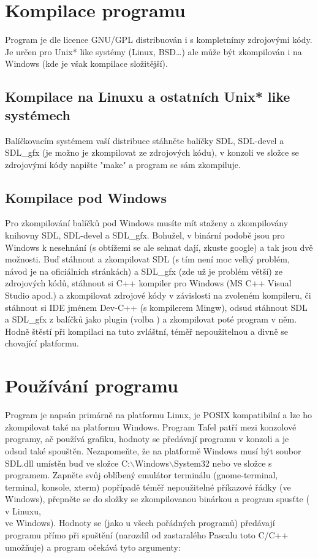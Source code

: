 \documentclass[a4paper,11pt,titlepage]{article}
\begin{document}
\section{Kompilace programu}
Program je dle licence GNU/GPL distribuován i s kompletnímy zdrojovými kódy. Je určen pro Unix* like systémy (Linux, BSD\ldots) ale může být zkompilován i na Windows (kde je však kompilace složitější).\\

\subsection{Kompilace na Linuxu a ostatních Unix* like systémech}
Balíčkovacím systémem vaší distribuce stáhněte balíčky SDL, SDL-devel a SDL\_gfx (je možno je zkompilovat ze zdrojových kódu), v konzoli ve složce se zdrojovými kódy napište "make" a program se sám zkompiluje.\\

\subsection{Kompilace pod Windows}
Pro zkompilování balíčků pod Windows musíte mít staženy a zkompilovány knihovny SDL, SDL-devel a SDL\_gfx. Bohužel, v binární podobě jsou pro Windows k nesehnání (s obtížemi se ale sehnat dají, zkuste google) a tak jsou dvě možnosti. Buď stáhnout a zkompilovat SDL (s tím není moc velký problém, návod je na oficiálních stránkách) a SDL\_gfx (zde už je problém větší) ze zdrojových kódů, stáhnout si C++ kompiler pro Windows (MS C++ Visual Studio apod.) a zkompilovat zdrojové kódy v závislosti na zvoleném kompileru, či stáhnout si IDE jménem Dev-C++ (s kompilerem Mingw), odsud stáhnout SDL a SDL\_gfx z balíčků jako plugin (volba ) a zkompilovat poté program v něm. Hodně štěstí při kompilaci na tuto zvláštní, téměř nepoužitelnou a divně se chovající platformu.
\newpage
\section{Používání programu}
Program je napsán primárně na platformu Linux, je POSIX kompatibilní a lze ho zkompilovat také na platformu Windows. Program Tafel patří mezi konzolové programy, ač používá grafiku, hodnoty se předávají programu v konzoli a je odsud také spouštěn. Nezapomeňte, že na platformě Windows musí být soubor SDL.dll umístěn buď ve složce C:$\backslash$Windows$\backslash$System32 nebo ve složce s programem. Zapněte svůj oblíbený emulátor terminálu (gnome-terminal, terminal, konsole, xterm) popřípadě  téměř nepoužitelné příkazové řádky (ve Windows), přepněte se do složky se zkompilovanou binárkou a program spusťte ( v Linuxu,\\   ve Windows). Hodnoty se (jako u všech pořádných programů) předávají programu přímo při spuštění (narozdíl od zastaralého Pascalu toto C/C++ umožňuje) a program očekává tyto argumenty:\linebreak[4]
\end{document}
